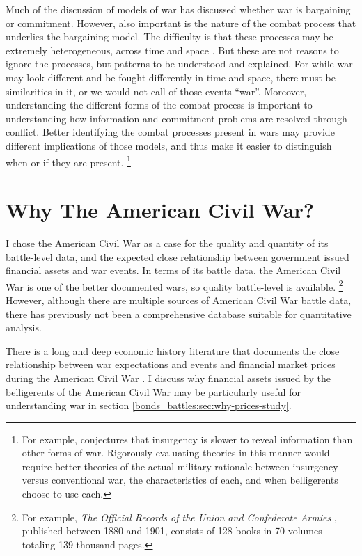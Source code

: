Much of the discussion of models of war has discussed whether war is bargaining or commitment.
However, also important is the nature of the combat process that underlies the bargaining model. %
The difficulty is that these processes may be extremely heterogeneous, across time and space \parencite{Reiter2003}.
But these are not reasons to ignore the processes, but patterns to be understood and explained. %
For while war may look different and be fought differently in time and
space, there must be similarities in it, or we would not call of those events ``war''. %
Moreover, understanding the different forms of the combat process is important to understanding how information and commitment problems are resolved through conflict. %
Better identifying the combat processes present in wars may provide different implications of those models, and thus make it easier to
distinguish when or if they are present.%
\footnote{%
  For example, \textcite{Walter2009} conjectures that insurgency is slower to reveal information than other forms of war. %
  Rigorously evaluating theories in this manner would require better theories of the actual military rationale between insurgency versus conventional war, the characteristics of each, and when belligerents choose to use each.
} %



\section{Why The American Civil War?}
\label{bonds_battles:sec:why-american-civil}

I chose the American Civil War as a case for the quality and quantity of its battle-level data, and the expected close relationship between government issued financial assets and war events.
In terms of its battle data, the American Civil War is one of the better documented wars, so quality battle-level is available.%
\footnote{%
  For example, \textit{The Official Records of the Union and  Confederate Armies} \parencites{US1901}, published between 1880 and 1901, consists of 128 books in 70 volumes totaling 139 thousand pages. %
} %
However, although there are multiple sources of American Civil War battle data, there has previously not been a comprehensive database suitable for quantitative analysis.

There is a long and deep economic history literature that documents the close relationship between war expectations and events and financial market prices during the American Civil War \parencites{Mitchell1903}{Mitchell1908}{Calomiris1988}{WillardGuinnaneEtAl1996}{McCandless1996}{SmithSmith1997}{Schwab1901}{Weidenmier2002}{BurdekinLangdana1993}{DavisPecquet1990}{BrownBurdekin2000}{OosterlinckWeidenmier2007}{Roll1972}.
I discuss why financial assets issued by the belligerents of the American Civil War may be particularly useful for understanding war in section \ref{bonds_battles:sec:why-prices-study}.

